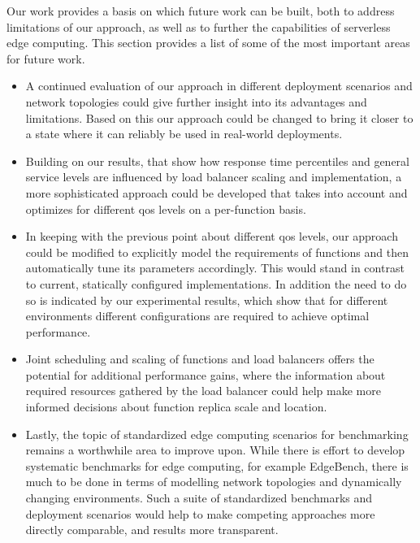 Our work provides a basis on which future work can be built, both to address limitations of our approach, as well as to further the capabilities of serverless edge computing.
This section provides a list of some of the most important areas for future work.
\begin{itemize}
    \item A continued evaluation of our approach in different deployment scenarios and network topologies could give further insight into its advantages and limitations. Based on this our approach could be changed to bring it closer to a state where it can reliably be used in real-world deployments.
    \item Building on our results, that show how response time percentiles and general service levels are influenced by load balancer scaling and implementation, a more sophisticated approach could be developed that takes into account and optimizes for different \gls{qos} levels on a per-function basis.
    \item In keeping with the previous point about different \gls{qos} levels, our approach could be modified to explicitly model the requirements of functions and then automatically tune its parameters accordingly. This would stand in contrast to current, statically configured implementations. In addition the need to do so is indicated by our experimental results, which show that for different environments different configurations are required to achieve optimal performance.
    \item Joint scheduling and scaling of functions and load balancers offers the potential for additional performance gains, where the information about required resources gathered by the load balancer could help make more informed decisions about function replica scale and location.
    \item Lastly, the topic of standardized edge computing scenarios for benchmarking remains a worthwhile area to improve upon. While there is effort to develop systematic benchmarks for edge computing, for example EdgeBench\cite{edgebench}, there is much to be done in terms of modelling network topologies and dynamically changing environments. Such a suite of standardized benchmarks and deployment scenarios would help to make competing approaches more directly comparable, and results more transparent.
    
\end{itemize}